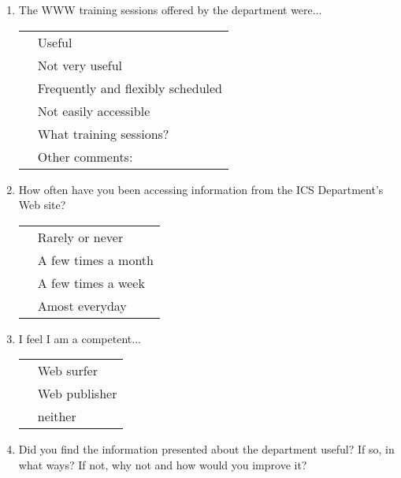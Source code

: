 \begin{enumerate}
\item{The WWW training sessions offered by the department were...}\\
  \begin{tabular} {ll}
  \underline{  }\underline{  }\underline{  }  & Useful\\
  \underline{  }\underline{  }\underline{  }  & Not very useful\\
  \underline{  }\underline{  }\underline{  }  & Frequently and flexibly scheduled\\
  \underline{  }\underline{  }\underline{  }  & Not easily accessible\\
  \underline{  }\underline{  }\underline{  }  & What training sessions?\\
  \underline{  }\underline{  }\underline{  }  & Other comments:\\
  \end{tabular}

\item{How often have you been accessing information from the ICS
  Department's Web site?}\\
  \begin{tabular}{ll}
  \underline{  }\underline{  }\underline{  }  & Rarely or never\\
  \underline{  }\underline{  }\underline{  }  & A few times a month\\
  \underline{  }\underline{  }\underline{  }  & A few times a week\\
  \underline{  }\underline{  }\underline{  }  & Amost everyday\\
  \end{tabular}

\item{I feel I am a competent...}\\
  \begin{tabular}{ll}
  \underline{  }\underline{  }\underline{  }  & Web surfer\\
  \underline{  }\underline{  }\underline{  }  & Web publisher\\
  \underline{  }\underline{  }\underline{  }  & neither\\
  \end{tabular}

\newpage
\item{Did you find the information presented about the department useful?
  If so, in what ways?  If not, why not and how would you improve it?}
\\ \\ \\


\end{enumerate}

